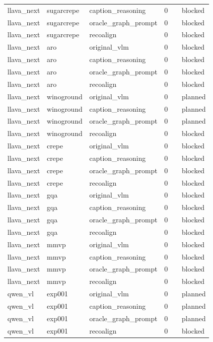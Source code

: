 \begin{table}[t]
\begin{tabular}{llllll}
llava\_next & sugarcrepe & caption\_reasoning & 0 &  & blocked \\
llava\_next & sugarcrepe & oracle\_graph\_prompt & 0 &  & blocked \\
llava\_next & sugarcrepe & recoalign & 0 &  & blocked \\
llava\_next & aro & original\_vlm & 0 &  & blocked \\
llava\_next & aro & caption\_reasoning & 0 &  & blocked \\
llava\_next & aro & oracle\_graph\_prompt & 0 &  & blocked \\
llava\_next & aro & recoalign & 0 &  & blocked \\
llava\_next & winoground & original\_vlm & 0 &  & planned \\
llava\_next & winoground & caption\_reasoning & 0 &  & planned \\
llava\_next & winoground & oracle\_graph\_prompt & 0 &  & planned \\
llava\_next & winoground & recoalign & 0 &  & blocked \\
llava\_next & crepe & original\_vlm & 0 &  & blocked \\
llava\_next & crepe & caption\_reasoning & 0 &  & blocked \\
llava\_next & crepe & oracle\_graph\_prompt & 0 &  & blocked \\
llava\_next & crepe & recoalign & 0 &  & blocked \\
llava\_next & gqa & original\_vlm & 0 &  & blocked \\
llava\_next & gqa & caption\_reasoning & 0 &  & blocked \\
llava\_next & gqa & oracle\_graph\_prompt & 0 &  & blocked \\
llava\_next & gqa & recoalign & 0 &  & blocked \\
llava\_next & mmvp & original\_vlm & 0 &  & blocked \\
llava\_next & mmvp & caption\_reasoning & 0 &  & blocked \\
llava\_next & mmvp & oracle\_graph\_prompt & 0 &  & blocked \\
llava\_next & mmvp & recoalign & 0 &  & blocked \\
qwen\_vl & exp001 & original\_vlm & 0 &  & planned \\
qwen\_vl & exp001 & caption\_reasoning & 0 &  & planned \\
qwen\_vl & exp001 & oracle\_graph\_prompt & 0 &  & planned \\
qwen\_vl & exp001 & recoalign & 0 &  & blocked \\

\end{tabular}
\end{table}
